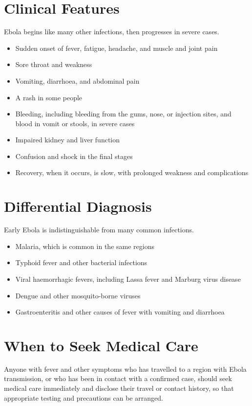 \section*{Clinical Features}
Ebola begins like many other infections, then progresses in severe cases.
\begin{itemize}
    \item Sudden onset of fever, fatigue, headache, and muscle and joint pain
    \item Sore throat and weakness
    \item Vomiting, diarrhoea, and abdominal pain
    \item A rash in some people
    \item Bleeding, including bleeding from the gums, nose, or injection sites, and blood in vomit or stools, in severe cases
    \item Impaired kidney and liver function
    \item Confusion and shock in the final stages
    \item Recovery, when it occurs, is slow, with prolonged weakness and complications
\end{itemize}

\section*{Differential Diagnosis}
Early Ebola is indistinguishable from many common infections.
\begin{itemize}
    \item Malaria, which is common in the same regions
    \item Typhoid fever and other bacterial infections
    \item Viral haemorrhagic fevers, including Lassa fever and Marburg virus disease
    \item Dengue and other mosquito-borne viruses
    \item Gastroenteritis and other causes of fever with vomiting and diarrhoea
\end{itemize}

\section*{When to Seek Medical Care}
Anyone with fever and other symptoms who has travelled to a region with Ebola transmission, or who has been in contact with a confirmed case, should seek medical care immediately and disclose their travel or contact history, so that appropriate testing and precautions can be arranged.

